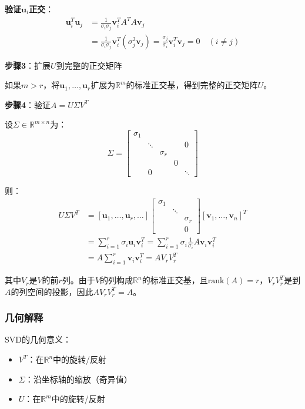 \documentclass[12pt,a4paper]{article}
\begin{document}
\textbf{验证$\bm{u}_i$正交}：
\begin{align}
\bm{u}_i^T \bm{u}_j &= \frac{1}{\sigma_i \sigma_j} \bm{v}_i^T A^T A \bm{v}_j \\
&= \frac{1}{\sigma_i \sigma_j} \bm{v}_i^T (\sigma_j^2 \bm{v}_j) = \frac{\sigma_j}{\sigma_i} \bm{v}_i^T \bm{v}_j = 0 \quad (i \neq j)
\end{align}

\textbf{步骤3}：扩展$U$到完整的正交矩阵

如果$m > r$，将$\bm{u}_1, \ldots, \bm{u}_r$扩展为$\mathbb{R}^m$的标准正交基，得到完整的正交矩阵$U$。

\textbf{步骤4}：验证$A = U\Sigma V^T$

设$\Sigma \in \mathbb{R}^{m \times n}$为：
\begin{equation}
\Sigma = \begin{bmatrix}
\sigma_1 & & & & \\
& \ddots & & & 0 \\
& & \sigma_r & & \\
& & & 0 & \\
& 0 & & & \ddots
\end{bmatrix}
\end{equation}

则：
\begin{align}
U\Sigma V^T &= [\bm{u}_1, \ldots, \bm{u}_r, \ldots] \begin{bmatrix}
\sigma_1 & & \\
& \ddots & \\
& & \sigma_r \\
& & 0
\end{bmatrix} [\bm{v}_1, \ldots, \bm{v}_n]^T \\
&= \sum_{i=1}^r \sigma_i \bm{u}_i \bm{v}_i^T = \sum_{i=1}^r \sigma_i \frac{1}{\sigma_i} A\bm{v}_i \bm{v}_i^T \\
&= A \sum_{i=1}^r \bm{v}_i \bm{v}_i^T = A V_r V_r^T
\end{align}

其中$V_r$是$V$的前$r$列。由于$V$的列构成$\mathbb{R}^n$的标准正交基，且$\text{rank}(A) = r$，$V_r V_r^T$是到$A$的列空间的投影，因此$A V_r V_r^T = A$。

\subsubsection{几何解释}

SVD的几何意义：
\begin{itemize}
\item $V^T$：在$\mathbb{R}^n$中的旋转/反射
\item $\Sigma$：沿坐标轴的缩放（奇异值）
\item $U$：在$\mathbb{R}^m$中的旋转/反射
\end{itemize}
\end{document}
